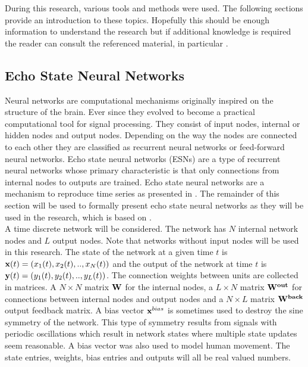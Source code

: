 \documentclass[letterpaper,9pt]{article}
\begin{document}
During this research, various tools and methods were used. The following sections provide an introduction to these topics. Hopefully this should be enough information to understand the research but if additional knowledge is required the reader can consult the referenced material, in particular \cite{JaegerESNTutorial}.

\subsection{Echo State Neural Networks}

Neural networks are computational mechanisms originally inspired on the structure of the brain. Ever since they evolved to become a practical computational tool for signal processing. They consist of input nodes, internal or hidden nodes and output nodes. Depending on the way the nodes are connected to each other they are classified as recurrent neural networks or feed-forward neural networks. Echo state neural networks (ESNs) are a type of recurrent neural networks whose primary characteristic is that only connections from internal nodes to outputs are trained. Echo state neural networks are a mechanism to reproduce time series as presented in \cite{JaegerESNTutorial}. The remainder of this section will be used to formally present echo state neural networks as they will be used in the research, which is based on \cite{JaegerESNTutorial,ESNVerstraeten}.\\

A time discrete network will be considered. The network has $N$ internal network nodes and $L$ output nodes. Note that networks without input nodes will be used in this research. The state of the network at a given time $t$ is ${\bf x}(t)=(x_1(t),x_2(t),..,x_N(t))$ and the output of the network at time $t$ is ${\bf y}(t)=(y_1(t),y_2(t),..,y_L(t))$. The connection weights between units are collected in matrices. A $N \times N$ matrix ${\bf W}$ for the internal nodes, a $L \times N$ matrix ${\bf W^{out}}$ for connections between internal nodes and output nodes and a $N \times L$ matrix ${\bf W^{back}}$ output feedback matrix. A bias vector ${\bf x}^{bias}$ is sometimes used to destroy the sine symmetry of the network. This type of symmetry results from signals with periodic oscillations which result in network states where multiple state updates seem reasonable. A bias vector was also used \cite{GentHumanMotion} to model human movement. The state entries, weights, bias entries and outputs will all be real valued numbers.\\
\end{document}
